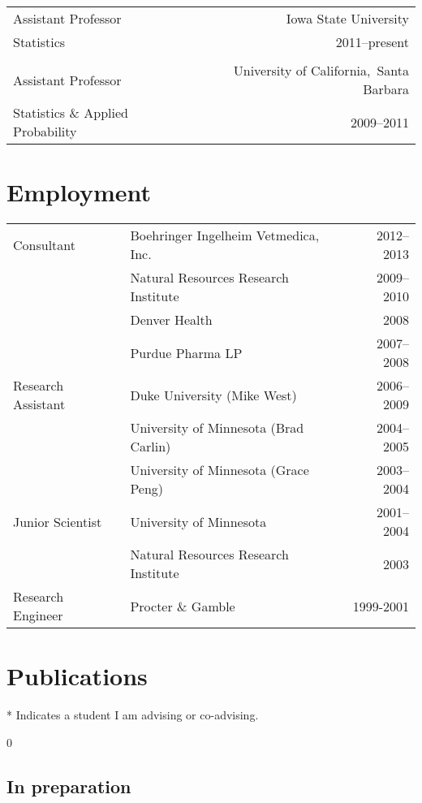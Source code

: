 \documentclass[overlapped,line]{res}
\providecommand{\includeinprep}{0}
\begin{document}
\begin{resume}
\begin{tabular}{l@{\qquad}r}
Assistant Professor & Iowa State University \\
Statistics & 2011--present \\
\\
Assistant Professor & University of California,\ Santa Barbara \\
Statistics \& Applied Probability & 2009--2011
\end{tabular}


\section{\bf Employment}

\begin{tabular}{l@{\qquad}l@{\qquad}r}
Consultant & Boehringer Ingelheim Vetmedica, Inc. & 2012--2013 \\
 & Natural Resources Research Institute  & 2009--2010 \\
 & Denver Health & 2008 \\
 & Purdue Pharma LP & 2007--2008 \\
Research Assistant & Duke University (Mike West) & 2006--2009 \\
 & University of Minnesota (Brad Carlin) & 2004--2005 \\
 & University of Minnesota (Grace Peng) & 2003--2004 \\
Junior Scientist & University of Minnesota & 2001--2004 \\
 & Natural Resources Research Institute & 2003 \\
Research Engineer & Procter \& Gamble & 1999-2001
\end{tabular}


\section{Publications}

* Indicates a student I am advising or co-advising.

\vspace{-0.3in}

\includeinprep
\subsection{\bf In preparation} \vspace{-0.2in}


\end{resume}
\end{document}
